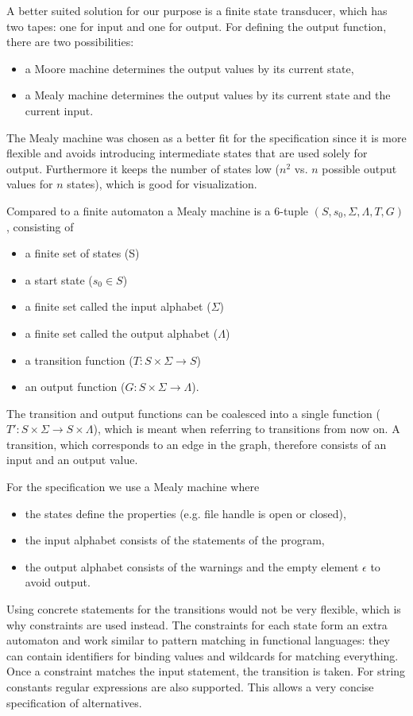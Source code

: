 A better suited solution for our purpose is a finite state transducer, which has two tapes: one for input and one for output. For defining the output function, there are two possibilities:
\begin{itemize}
\item a Moore machine determines the output values by its current state,
\item a Mealy machine determines the output values by its current state and the current input.
\end{itemize}
The Mealy machine was chosen as a better fit for the specification since it is more flexible and avoids introducing intermediate states that are used solely for output. Furthermore it keeps the number of states low ($n^2$ vs. $n$ possible output values for $n$ states), which is good for visualization.

Compared to a finite automaton a Mealy machine is a 6-tuple $(S, s_0, \Sigma, \Lambda, T, G)$, consisting of
\begin{itemize}
\item a finite set of states (S)
\item a start state ($s_0 \in S$)
\item a finite set called the input alphabet ($\Sigma$)
\item a finite set called the output alphabet ($\Lambda$)
\item a transition function ($T : S \times \Sigma \rightarrow S$)
\item an output function ($G : S \times \Sigma \rightarrow \Lambda$).
\end{itemize}
The transition and output functions can be coalesced into a single function ($T' : S \times \Sigma \rightarrow S \times \Lambda$), which is meant when referring to transitions from now on.
A transition, which corresponds to an edge in the graph, therefore consists of an input and an output value.

For the specification we use a Mealy machine where
\begin{itemize}
\item the states define the properties (e.g. file handle is open or closed),
\item the input alphabet consists of the statements of the program,
\item the output alphabet consists of the warnings and the empty element $\epsilon$ to avoid output.
\end{itemize}
Using concrete statements for the transitions would not be very flexible, which is why constraints are used instead. The constraints for each state form an extra automaton and work similar to pattern matching in functional languages: they can contain identifiers for binding values and wildcards for matching everything. Once a constraint matches the input statement, the transition is taken. For string constants regular expressions are also supported.
This allows a very concise specification of alternatives.

